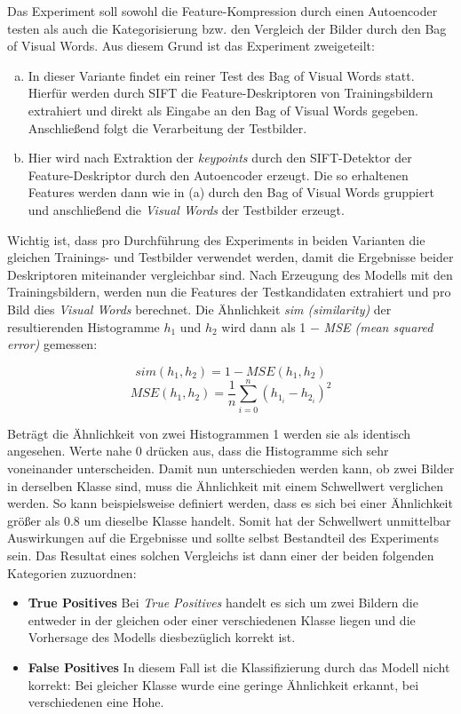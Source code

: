 Das Experiment soll sowohl die Feature-Kompression durch einen Autoencoder testen als auch die Kategorisierung bzw. den Vergleich der Bilder durch den Bag of Visual Words. Aus diesem Grund ist das Experiment zweigeteilt: 

\begin{enumerate}[(a)]%
	\item In dieser Variante findet ein reiner Test des Bag of Visual Words statt. Hierfür werden durch SIFT die Feature-Deskriptoren von Trainingsbildern extrahiert und direkt als Eingabe an den Bag of Visual Words gegeben. Anschließend folgt die Verarbeitung der Testbilder.
	\item Hier wird nach Extraktion der \textit{keypoints} durch den SIFT-Detektor der Feature-Deskriptor durch den Autoencoder erzeugt. Die so erhaltenen Features werden dann wie in (a) durch den Bag of Visual Words gruppiert und anschließend die \textit{Visual Words} der Testbilder erzeugt.
\end{enumerate}

Wichtig ist, dass pro Durchführung des Experiments in beiden Varianten die gleichen Trainings- und Testbilder verwendet werden, damit die Ergebnisse beider Deskriptoren miteinander vergleichbar sind. \newline
Nach Erzeugung des Modells mit den Trainingsbildern, werden nun die Features der Testkandidaten extrahiert und pro Bild dies \textit{Visual Words} berechnet. Die Ähnlichkeit \textit{sim (similarity)} der resultierenden Histogramme $h_1$ und $h_2$ wird dann als 1 $-$ \textit{MSE (mean squared error)} gemessen:

$$sim(h_1, h_2) = 1 - MSE(h_1, h_2)$$
$$MSE(h_1, h_2) = \frac{1}{n}\sum_{i=0}^{n}(h_{1_i} - h_{2_i})^{2}$$

Beträgt die Ähnlichkeit von zwei Histogrammen 1 werden sie als identisch angesehen. Werte nahe 0 drücken aus, dass die Histogramme sich sehr voneinander unterscheiden. Damit nun unterschieden werden kann, ob zwei Bilder in derselben Klasse sind, muss die Ähnlichkeit mit einem Schwellwert verglichen werden. So kann beispielsweise definiert werden, dass es sich bei einer Ähnlichkeit größer als $0.8$ um dieselbe Klasse handelt. Somit hat der Schwellwert unmittelbar Auswirkungen auf die Ergebnisse und sollte selbst Bestandteil des Experiments sein. Das Resultat eines solchen Vergleichs ist dann einer der beiden folgenden Kategorien zuzuordnen:

\begin{itemize}
	\item \textbf{True Positives} Bei \textit{True Positives} handelt es sich um zwei Bildern die entweder in der gleichen oder einer verschiedenen Klasse liegen und die Vorhersage des Modells diesbezüglich korrekt ist.
	\item \textbf{False Positives} In diesem Fall ist die Klassifizierung durch das Modell nicht korrekt: Bei gleicher Klasse wurde eine geringe Ähnlichkeit erkannt, bei verschiedenen eine Hohe.
\end{itemize}

